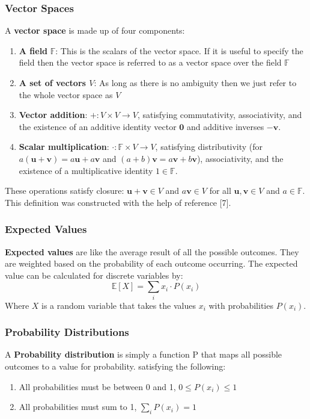 \subsubsection{Vector Spaces}

A \textbf{vector space} is made up of four components:
\begin{enumerate}
    \item \textbf{A field} \( \mathbb{F} \): This is the scalars of the vector space. If it is useful to specify the field then the vector space is referred to as a vector space over the field \( \mathbb{F} \)
    \item \textbf{A set of vectors \( V \)}: As long as there is no ambiguity then we just refer to the whole vector space as \( V \)
    \item \textbf{Vector addition}: \( +: V \times V \to V \), satisfying commutativity, associativity, and the existence of an additive identity vector \( \mathbf{0} \) and additive inverses \( -\mathbf{v} \).
    \item \textbf{Scalar multiplication}: \( \cdot: \mathbb{F} \times V \to V \), satisfying distributivity (for \( a (\mathbf{u} + \mathbf{v}) = a\mathbf{u} + a\mathbf{v} \) and \( (a + b)\mathbf{v} = a\mathbf{v} + b\mathbf{v} \)), associativity, and the existence of a multiplicative identity \( 1 \in \mathbb{F} \).
\end{enumerate}

\noindent These operations satisfy closure: \( \mathbf{u} + \mathbf{v} \in V \) and \( a\mathbf{v} \in V \) for all \( \mathbf{u}, \mathbf{v} \in V \) and \( a \in \mathbb{F} \).
This definition was constructed with the help of reference [7].


\subsubsection{Expected Values}
\noindent \textbf{Expected values} are like the average result of all the possible outcomes. They are weighted based on the probability of each outcome occurring. The expected value can be calculated for discrete variables by:
\begin{equation}
\mathbb{E}[X] = \sum_i x_i \cdot P(x_i)
\end{equation}
Where $X$ is a random variable that takes the values \(x_i\) with probabilities \( P(x_i) \).

\subsubsection{Probability Distributions}
A \textbf{Probability distribution} is simply a function P that maps all possible outcomes to a value for probability. satisfying the following:
\begin{enumerate}
    \item All probabilities must be between 0 and 1, \(0\leq P(x_i) \leq 1\)
    \item All probabilities must sum to 1, \(\sum_i P(x_i) = 1\)
\end{enumerate}

